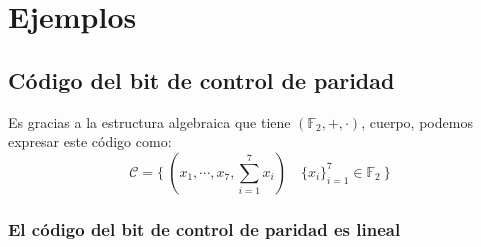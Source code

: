 %
%

\section{Ejemplos}
%
%
\subsection{C\'odigo del bit de control de paridad}

Es gracias a la estructura algebraica que tiene $(\mathbb{F}_2,+,\cdot )$, 
cuerpo, podemos expresar este c\'odigo como:
\begin{displaymath}
\mathcal{C}=\{\ (x_1,\cdots,x_7,\sum_{i=1}^7x_i)\quad \{x_i\}_{i=1}^7\in
\mathbb{F}_2\ \}
\end{displaymath}

\subsubsection{El c\'odigo del bit de control de paridad es lineal}

